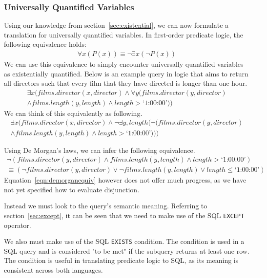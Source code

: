 \documentclass[a4paper, 11pt]{article}
\begin{document}
    \subsubsection{Universally Quantified Variables}
      Using our knowledge from section~\ref{sec:existential}, we can now formulate
      a translation for universally quantified variables. In first-order predicate
      logic, the following equivalence holds:
      \begin{gather}
        \forall x(P(x)) \equiv \lnot \exists x(\lnot P(x))
      \end{gather}
      We can use this equivalence to simply encounter universally quantified
      variables as existentially quantified. Below is an example query in logic
      that aims to return all directors such that every film that they have
      directed is longer than one hour.
      \begin{multline}
        \exists x(films.director(x, director) \land \forall y(films.director(y,
        director) \\ \land films.length(y, length) \land length >
        \text{`1:00:00'}))
      \end{multline}
      We can think of this equivalently as following.
      \begin{multline}
        \label{eqn:except}
        \exists x(films.director(x, director) \land \lnot \exists y,length(\lnot(films.director(y,
        director) \\ \land films.length(y, length) \land length > \text{`1:00:00'})))
      \end{multline}

      Using De Morgan's laws, we can infer the following equivalence.
      \begin{multline}
        \label{eqn:demorganequiv}
        \lnot(films.director(y, director) \land films.length(y, length)
        \land length > \text{`1:00:00'}) \\ \equiv (\lnot films.director(y,
        director) \lor \lnot films.length(y, length) \lor length \le \text{`1:00:00'})
      \end{multline}
      Equation~\ref{eqn:demorganequiv} however does not offer much progress, as we
      have not yet specified how to evaluate disjunction.

      Instead we must look to the query's semantic meaning. Referring to
      section~\ref{sec:except}, it can be seen that we need to make use of the SQL
      \texttt{EXCEPT} operator.

      We also must make use of the SQL \texttt{EXISTS} condition. The condition is
      used in a SQL query and is considered "to be met" if the subquery returns at
      least one row\cite{technetEXISTS}. The condition is useful in translating
      predicate logic to SQL, as its meaning is consistent across both languages.
\end{document}

